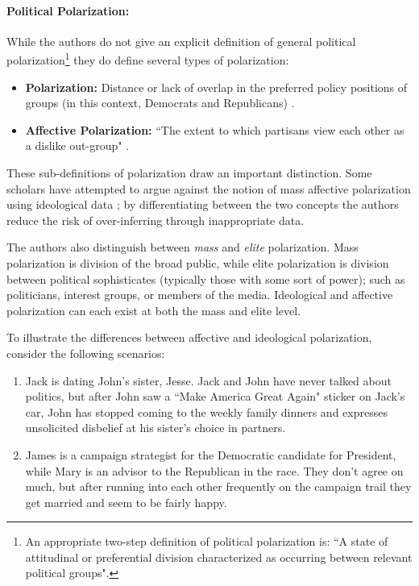 \documentclass[12pt]{article}
\begin{document}
\paragraph{Political Polarization:} 
While the authors do not give an explicit definition of general political polarization\footnote{An appropriate two-step definition of political polarization is: ``A state of attitudinal or preferential division characterized as occurring between relevant political groups".} they do define several types of polarization:
\begin{itemize}
\item\textbf{Polarization:} Distance or lack of overlap in the preferred policy positions of groups (in this context, Democrats and Republicans) \citep[p. 405]{iyengar2012affect}.
\item\textbf{Affective Polarization:} ``The extent to which partisans view each other as a dislike out-group" \citep[p. 406]{iyengar2012affect}.
\end{itemize}
These sub-definitions of polarization draw an important distinction. Some scholars have attempted to argue against the notion of mass affective polarization using ideological data \citep{fiorina2005culture}; by differentiating between the two concepts the authors reduce the risk of over-inferring through inappropriate data.

The authors also distinguish between \textit{mass} and \textit{elite} polarization. Mass polarization is division of the broad public, while elite polarization is division between political sophisticates (typically those with some sort of power); such as politicians, interest groups, or members of the media. Ideological and affective polarization can each exist at both the mass and elite level.

To illustrate the differences between affective and ideological polarization, consider the following scenarios:
\begin{enumerate}
\item Jack is dating John's sister, Jesse. Jack and John have never talked about politics, but after John saw a ``Make America Great Again" sticker on Jack's car, John has stopped coming to the weekly family dinners and expresses unsolicited disbelief at his sister's choice in partners.

\item James is a campaign strategist for the Democratic candidate for President, while Mary is an advisor to the Republican in the race. They don't agree on much, but after running into each other frequently on the campaign trail they get married and seem to be fairly happy. 

\end{enumerate}
\end{document}
